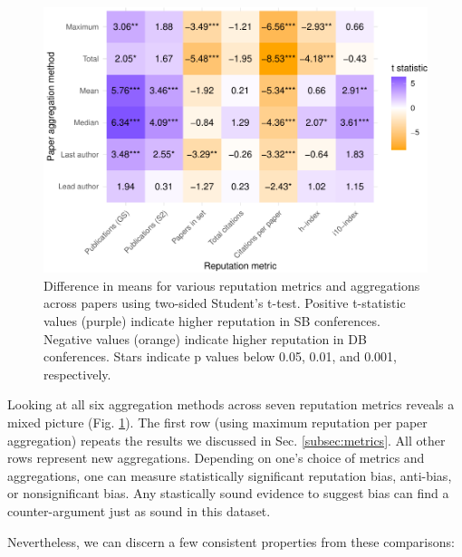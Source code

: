 \documentclass[12pt]{article}
\begin{document}
\begin{figure}
\centering
\includegraphics{prestige_files/figure-latex/mean-diffs-1.pdf}
\caption{\label{fig:mean-diffs}Difference in means for various reputation metrics and aggregations across papers using two-sided Student's t-test. Positive t-statistic values (purple) indicate higher reputation in SB conferences. Negative values (orange) indicate higher reputation in DB conferences. Stars indicate p values below 0.05, 0.01, and 0.001, respectively.}
\end{figure}

Looking at all six aggregation methods across seven reputation metrics reveals a mixed picture (Fig. \ref{fig:mean-diffs}).
The first row (using maximum reputation per paper aggregation) repeats the results we discussed in Sec. \ref{subsec:metrics}.
All other rows represent new aggregations.
Depending on one's choice of metrics and aggregations, one can measure statistically significant reputation bias, anti-bias, or nonsignificant bias.
Any stastically sound evidence to suggest bias can find a counter-argument just as sound in this dataset.

Nevertheless, we can discern a few consistent properties from these comparisons:
\end{document}
